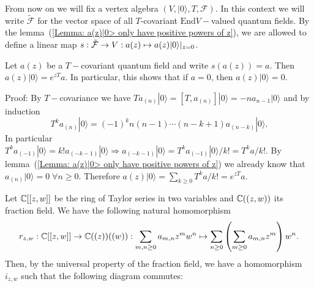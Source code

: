 \begin{dang}
    \begin{notation}
        From now on we will fix a vertex algebra $(V,|0\rangle, T,\mathcal{F})$. In this context we will write $\widetilde{\mathcal{F}}$ for the vector space of all $T$-covariant $\text{End}V-$valued quantum fields. By the lemma~(\ref{Lemma: a(z)|0> only have positive powers of z}), we are allowed to define a linear map $s:\Tilde{\mathcal{F}}\rightarrow V:a(z)\mapsto a(z)|0\rangle |_{z=0}$.
    \end{notation}
\end{dang}
\begin{dang}
    \begin{lemma}\label{Lemma: s(a(z))=0 implies a(z)|0>=0}\cite{de2006finite}
        Let $a(z)$ be a $T-$covariant quantum field and write $s(a(z))=a$. Then $a(z)|0\rangle=e^{zT}a$. In particular, this shows that if $a=0$, then $a(z)|0\rangle=0$.
    \end{lemma}
\end{dang}
Proof: By $T-$covariance we have $Ta_{(n)}|0\rangle=[T,a_{(n)}]|0\rangle=-na_{n-1}|0\rangle$ and by induction 
\begin{equation}
    T^ka_{(n)}|0\rangle =(-1)^kn(n-1)\cdots(n-k+1)a_{(n-k)}|0\rangle.
\end{equation}
In particular $T^ka_{(-1)}|0\rangle=k!a_{(-k-1)}|0\rangle\Rightarrow a_{(-k-1)}|0\rangle=T^ka_{(-1)}|0\rangle/k!=T^ka/k!$. By lemma~(\ref{Lemma: a(z)|0> only have positive powers of z}) we already know that $a_{(n)}|0\rangle=0\;\forall n\geq0$. Therefore $a(z)|0\rangle=\sum_{k\geq0}T^ka/k!=e^{zT}a$.\par
Let $\mathbb{C}[[z,w]]$ be the ring of Taylor series in two variables and $\mathbb{C}((z,w))$ its fraction field. We have the following natural homomorphism
\begin{equation}
    r_{z,w}:\mathbb{C}[[z,w]]\rightarrow\mathbb{C}((z))((w)):\sum_{m,n\geq0}a_{m,n}z^mw^n\mapsto \sum_{n\geq0}\left(\sum_{m\geq0}a_{m,n}z^m\right)w^n.
\end{equation}
Then, by the universal property of the fraction field, we have a homomorphism $i_{z,w}$ such that the following diagram commutes:
\begin{center}
\end{center}
